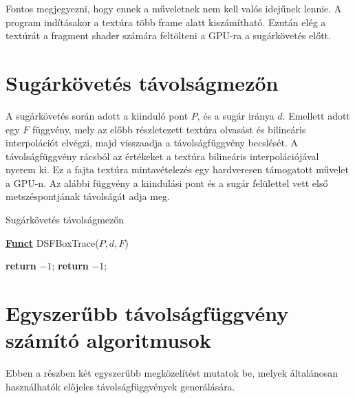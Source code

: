 Fontos megjegyezni, hogy ennek a műveletnek nem kell valós idejűnek lennie. A program indításakor a textúra több frame alatt kiszámítható. Ezután elég a textúrát a fragment shader számára feltölteni a GPU-ra a sugárkövetés előtt.


\section{Sugárkövetés távolságmezőn}

A sugárkövetés során adott a kiinduló pont $P$, és a sugár iránya $d$. Emellett adott egy $F$ függvény, mely az előbb részletezett textúra olvasást és bilineáris interpolációt elvégzi, majd visszaadja a távolságfüggvény becslését. A távolságfüggvény rácsból az értékeket a textúra bilineáris interpolációjával nyerem ki. Ez a fajta textúra mintavételezés egy hardveresen támogatott művelet a GPU-n. Az alábbi függvény a kiindulási pont és a sugár felülettel vett első metszéspontjának távolságát adja meg.

\begin{algorithm}[H]
	\caption{Sugárkövetés távolságmezőn}
	\label{alg:ibb}
	\textbf{\underline{Funct}} DSFBoxTrace($P,d,F$)
	\begin{algorithmic}[1] %
		 
		\EndIf
		 
		\EndIf
		                     
		 
		\EndIf
		\State \textbf{return} $-1$; 
		\EndIf
		\EndFor
		\State \textbf{return} $-1$; 
	\end{algorithmic}
\end{algorithm}


\section{Egyszerűbb távolságfüggvény számító algoritmusok}

Ebben a részben két egyszerűbb megközelítést mutatok be, melyek általánosan használhatók előjeles távolságfüggvények generálására.

